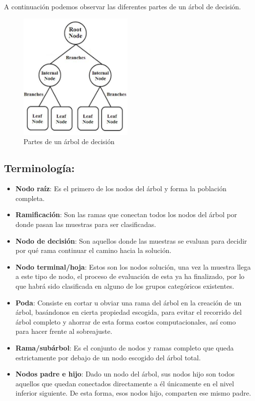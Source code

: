  A continuación podemos observar las diferentes partes de un árbol de decisión.
 
  \begin{figure}[H]
 	\centering
 	\includegraphics[width=0.5\textwidth]{imagenes/ejemploArbol} 
 	\caption{Partes de un árbol de decisión \cite{ref5}}
 \end{figure}

\subsection{Terminología:}
\begin{itemize}
	\item \textbf{Nodo raíz}: Es el primero de los nodos del árbol y forma la población completa.
	\item \textbf{Ramificación}: Son las ramas que conectan todos los nodos del árbol por donde pasan las muestras para ser clasificadas.
	\item \textbf{Nodo de decisión}: Son aquellos donde las muestras se evaluan para decidir por qué rama continuar el camino hacia la solución.
	\item \textbf{Nodo terminal/hoja}: Estos son los nodos solución, una vez la muestra llega a este tipo de nodo, el proceso de evaluación de esta ya ha finalizado, por lo que habrá sido clasificada en alguno de los grupos categóricos existentes.
	\item \textbf{Poda}: Consiste en cortar u obviar una rama del árbol en la creación de un árbol, basándonos en cierta propiedad escogida, para evitar el recorrido del árbol completo y ahorrar de esta forma costos computacionales, así como para hacer frente al sobreajuste.
	\item \textbf{Rama/subárbol}: Es el conjunto de nodos y ramas completo que queda estrictamente por debajo de un nodo escogido del árbol total.
	\item \textbf{Nodos padre e hijo}: Dado un nodo del árbol, sus nodos hijo son todos aquellos que quedan conectados directamente a él únicamente en el nivel inferior siguiente. De esta forma, esos nodos hijo, comparten ese mismo padre.
\end{itemize}


